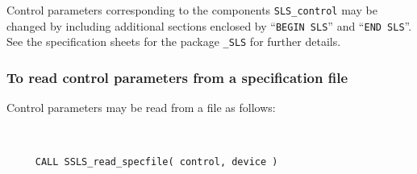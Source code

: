 \documentclass{galahad}
\begin{document}
Control parameters corresponding to the components
{\tt SLS\_control}
may be changed by including additional sections enclosed by
``{\tt BEGIN SLS}'' and
``{\tt END SLS}''.
See the specification sheets for the package
{\tt \libraryname\_SLS}
for further details.

\subsubsection{To read control parameters from a specification file}
\label{readspec}

Control parameters may be read from a file as follows:
\hskip0.5in

\def\baselinestretch{0.8}
{\tt
\begin{verbatim}
     CALL SSLS_read_specfile( control, device )
\end{verbatim}
}
\def\baselinestretch{1.0}
\end{document}
